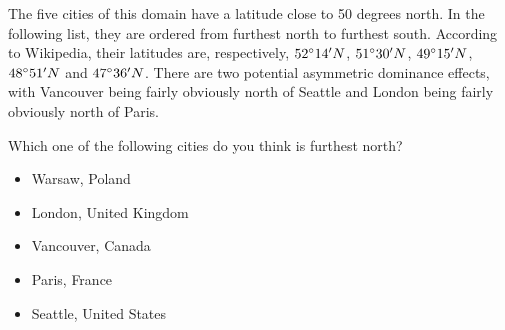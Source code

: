 
The five cities of this domain have a latitude close to 50 degrees north.
In the following list, they are ordered from furthest north to furthest south.
According to Wikipedia, their latitudes are, respectively, $52\degree14^\prime N$, $51\degree30^\prime N$, $49\degree15^\prime N$, $48\degree51^\prime N$ and $47\degree36^\prime N$.
There are two potential asymmetric dominance effects, with Vancouver being fairly obviously north of Seattle and London being fairly obviously north of Paris.

\begin{tcolorbox}
Which one of the following cities do you think is furthest north?

\begin{itemize}
	\setlength\itemsep{-5pt}
	\item Warsaw, Poland
	\item London, United Kingdom
	\item Vancouver, Canada
	\item Paris, France
	\item Seattle, United States
\end{itemize}
\end{tcolorbox}
